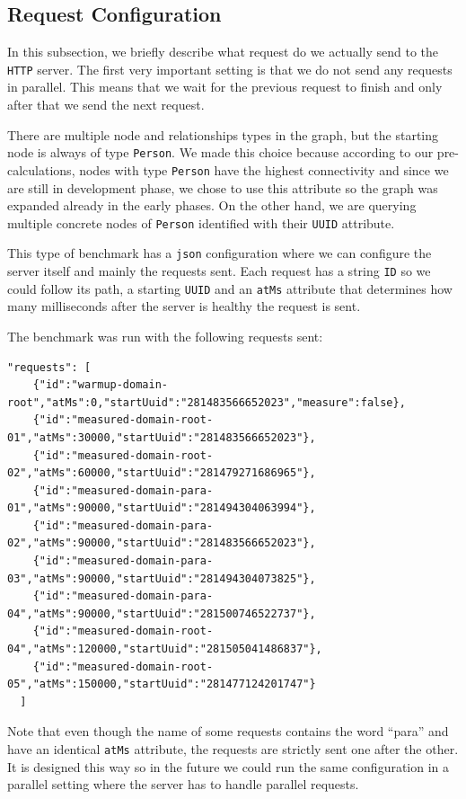 \documentclass[11pt,a4paper]{article}
\begin{document}
\subsection{Request Configuration}

In this subsection, we briefly describe what request do we actually send to the \texttt{HTTP} server. The first very important setting is that we do not send any requests in parallel. This means that we wait for the previous request to finish and only after that we send the next request. 

There are multiple node and relationships types in the graph, but the starting node is always of type \texttt{Person}. We made this choice because according to our pre-calculations, nodes with type \texttt{Person} have the highest connectivity and since we are still in development phase, we chose to use this attribute so the graph was expanded already in the early phases. On the other hand, we are querying multiple concrete nodes of \texttt{Person} identified with their \texttt{UUID} attribute.

This type of benchmark has a \texttt{json} configuration where we can configure the server itself and mainly the requests sent.  Each request has a string \texttt{ID} so we could follow its path, a starting \texttt{UUID} and an \texttt{atMs} attribute that determines how many milliseconds after the server is healthy the request is sent. 

The benchmark was run with the following requests sent:

  
  \begin{lstlisting}[style=json]
"requests": [
    {"id":"warmup-domain-root","atMs":0,"startUuid":"281483566652023","measure":false},
    {"id":"measured-domain-root-01","atMs":30000,"startUuid":"281483566652023"},
    {"id":"measured-domain-root-02","atMs":60000,"startUuid":"281479271686965"},
    {"id":"measured-domain-para-01","atMs":90000,"startUuid":"281494304063994"},
    {"id":"measured-domain-para-02","atMs":90000,"startUuid":"281483566652023"},
    {"id":"measured-domain-para-03","atMs":90000,"startUuid":"281494304073825"},
    {"id":"measured-domain-para-04","atMs":90000,"startUuid":"281500746522737"},
    {"id":"measured-domain-root-04","atMs":120000,"startUuid":"281505041486837"},
    {"id":"measured-domain-root-05","atMs":150000,"startUuid":"281477124201747"}
  ]
\end{lstlisting}

Note that even though the name of some requests contains the word ``para'' and have an identical \texttt{atMs} attribute, the requests are strictly sent one after the other. It is designed this way so in the future we could run the same configuration in a parallel setting where the server has to handle parallel requests.
\end{document}
